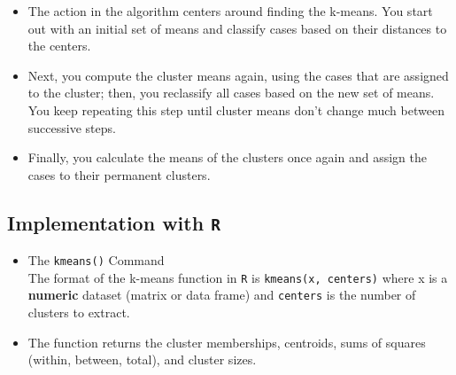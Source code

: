 \documentclass[12pt]{article}
\begin{document}
\begin{itemize}
\item The action in the algorithm centers around finding the k-means. You start out with an initial set of means and classify cases based on their distances to the centers.

\item Next, you compute the cluster means again, using the cases that are assigned to the cluster; then, you reclassify all cases based on the new set of means. You keep repeating this step until cluster means don't change much between successive steps.

\item Finally, you calculate the means of the clusters once again and assign the cases to their permanent clusters.
\end{itemize}
\newpage
\subsection{Implementation with \texttt{R}}
\begin{itemize}
\item The \texttt{kmeans()} Command\\
The format of the k-means function in \texttt{R} is \texttt{kmeans(x, centers)} where x is a \textbf{numeric} dataset (matrix or data frame) and \texttt{centers} is the number of clusters to extract. \item The function returns the cluster memberships, centroids, sums of squares (within, between, total), and cluster sizes.
\end{itemize}
\end{document}
